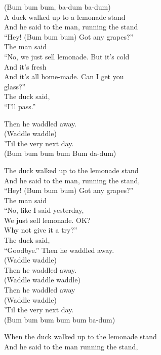 \vspace{10pt}
(Bum bum bum, ba-dum ba-dum)\\
A duck walked up to a lemonade stand\\
And he said to the man, running the stand\\
``Hey! (Bum bum bum) Got any grapes?''\\
The man said\\
``No, we just sell lemonade. But it's cold\\
And it's fresh\\
And it's all home-made. Can I get you\\
glass?''\\
The duck said,\\
``I'll pass.''\par
\vspace{10pt}
Then he waddled away.\\
(Waddle waddle)\\
'Til the very next day.\\
(Bum bum bum bum Bum da-dum)\par
\vspace{10pt}
The duck walked up to the lemonade stand\\
And he said to the man, running the stand,\\
``Hey! (Bum bum bum) Got any grapes?''\\
The man said\\
``No, like I said yesterday,\\
We just sell lemonade. OK?\\
Why not give it a try?''\\
The duck said,\\
``Goodbye.''
\newpage
Then he waddled away.\\
(Waddle waddle)\\
Then he waddled away.\\
(Waddle waddle waddle)\\
Then he waddled away\\
(Waddle waddle)\\
'Til the very next day.\\
(Bum bum bum bum bum ba-dum)\par
\vspace{10pt}
When the duck walked up to the lemonade stand\\
And he said to the man running the stand,\\
